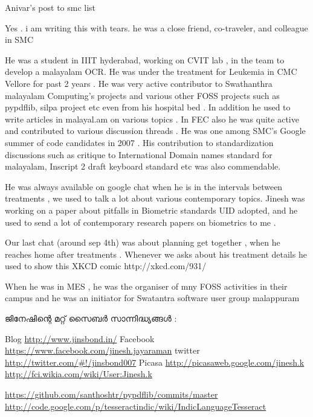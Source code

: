 Anivar's post to smc list

Yes . i am writing this with tears. he was a close friend,
co-traveler, and colleague in SMC

 He was a student in IIIT hyderabad, working on CVIT lab , in the team
to develop a malayalam OCR. He was under the treatment for Leukemia in
CMC Vellore for past 2 years . He was very active contributor to
Swathanthra malayalam Computing's projects and various other FOSS
projects such as pypdflib, silpa project etc even from his hospital
bed . In addition he used to write articles in malayal.am on various
topics . In FEC also he was quite active and contributed to various
discussion threads . He was one among SMC's  Google summer of code
candidates in 2007 . His contribution to standardization discussions
such as critique to International Domain names standard for malayalam,
Inscript 2 draft keyboard standard etc was also commendable.

He was always available on google chat when he is in the intervals
between treatments , we used to talk a lot about various contemporary
topics. Jinesh was working on a paper about pitfalls in Biometric
standards UID adopted, and he used to send a lot of contemporary
research papers on biometrics to me .

Our last chat (around sep 4th) was about planning get together , when
he reaches home after treatments .
Whenever we asks about his treatment details he used to show this XKCD comic
http://xkcd.com/931/

When he was in MES , he was the organiser of mny FOSS activities in
their campus and he was an initiator for Swatantra software user group
malappuram

­ജി­നേ­ഷി­ന്റെ മറ്റ് സൈ­ബര്‍ സാ­ന്നി­ദ്ധ്യ­ങ്ങള്‍ :

Blog \url{http://www.jinsbond.in/}
Facebook \url{https://www.facebook.com/jinesh.jayaraman}
twitter \url{http://twitter.com/#!/jinsbond007}
Picasa \url{http://picasaweb.google.com/jinesh.k}
\url{http://fci.wikia.com/wiki/User:Jinesh.k}

\url{https://github.com/santhoshtr/pypdflib/commits/master}
\url{http://code.google.com/p/tesseractindic/wiki/IndicLanguageTesseract}

\newpage
